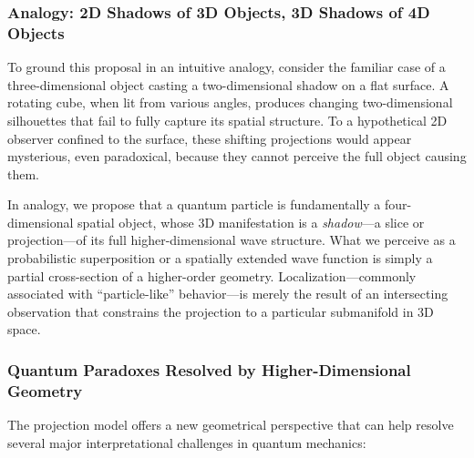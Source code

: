 \documentclass[12pt]{article}
\begin{document}
\subsubsection{Analogy: 2D Shadows of 3D Objects, 3D Shadows of 4D Objects}

To ground this proposal in an intuitive analogy, consider the familiar case of a three-dimensional object casting a two-dimensional shadow on a flat surface. A rotating cube, when lit from various angles, produces changing two-dimensional silhouettes that fail to fully capture its spatial structure. To a hypothetical 2D observer confined to the surface, these shifting projections would appear mysterious, even paradoxical, because they cannot perceive the full object causing them.

In analogy, we propose that a quantum particle is fundamentally a four-dimensional spatial object, whose 3D manifestation is a \textit{shadow}—a slice or projection—of its full higher-dimensional wave structure. What we perceive as a probabilistic superposition or a spatially extended wave function is simply a partial cross-section of a higher-order geometry. Localization—commonly associated with “particle-like” behavior—is merely the result of an intersecting observation that constrains the projection to a particular submanifold in 3D space.

\begin{center}
\end{center}

\subsubsection{Quantum Paradoxes Resolved by Higher-Dimensional Geometry}

The projection model offers a new geometrical perspective that can help resolve several major interpretational challenges in quantum mechanics:
\end{document}
